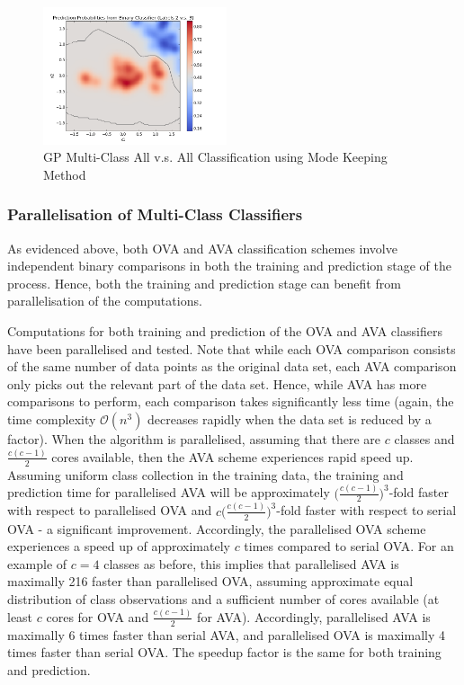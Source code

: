 \begin{figure}[!htbp]
						\includegraphics[width=0.48\textwidth]{Figures/Progress/modekeepingAVA/Figure14.png}
					\caption{GP Multi-Class All v.s. All Classification using Mode Keeping Method}
					\label{ProgressReport:GaussianProcessModels:Figure:modekeepingAVA3}
				\end{figure}
											
				\FloatBarrier
					
			\subsubsection{Parallelisation of Multi-Class Classifiers}
			
				As evidenced above, both OVA and AVA classification schemes involve independent binary comparisons in both the training and prediction stage of the process. Hence, both the training and prediction stage can benefit from parallelisation of the computations.
				
				Computations for both training and prediction of the OVA and AVA classifiers have been parallelised and tested. Note that while each OVA comparison consists of the same number of data points as the original data set, each AVA comparison only picks out the relevant part of the data set. Hence, while AVA has more comparisons to perform, each comparison takes significantly less time (again, the time complexity $\mathcal{O}(n^{3})$ decreases rapidly when the data set is reduced by a factor). When the algorithm is parallelised, assuming that there are $c$ classes and $\frac{c (c - 1)}{2}$ cores available, then the AVA scheme experiences rapid speed up. Assuming uniform class collection in the training data, the training and prediction time for parallelised AVA will be approximately $\Big(\frac{c (c - 1)}{2}\Big)^{3}$-fold faster with respect to parallelised OVA and $c \Big(\frac{c (c - 1)}{2}\Big)^{3}$-fold faster with respect to serial OVA - a significant improvement. Accordingly, the parallelised OVA scheme experiences a speed up of approximately $c$ times compared to serial OVA. For an example of $c = 4$ classes as before, this implies that parallelised AVA is maximally 216 faster than parallelised OVA, assuming approximate equal distribution of class observations and a sufficient number of cores available (at least $c$ cores for OVA and $\frac{c (c - 1)}{2}$ for AVA). Accordingly, parallelised AVA is maximally 6 times faster than serial AVA, and parallelised OVA is maximally 4 times faster than serial OVA. The speedup factor is the same for both training and prediction.
				
